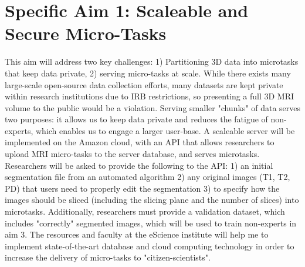 \section{Specific Aim 1: Scaleable and Secure Micro-Tasks}

This aim will address two key challenges: 1) Partitioning 3D data into microtasks that keep data private, 2) serving micro-tasks at scale. While there exists many large-scale open-source data collection efforts, many datasets are kept private within research institutions due to  IRB restrictions, so presenting a full 3D MRI volume to the public would be a violation. Serving smaller "chunks" of data serves two purposes: it allows us to keep data private and reduces the fatigue of non-experts, which enables us to engage a larger user-base. A scaleable server will be implemented on the Amazon cloud, with an API that allows researchers to upload MRI micro-tasks to the server database, and serves microtasks. Researchers will be asked to provide the following to the API: 1) an initial segmentation file from an automated algorithm 2) any original images (T1, T2, PD) that  users need to properly edit the segmentation 3) to specify how the images should be sliced (including the slicing plane and the number of slices) into microtasks. Additionally, researchers must provide a validation dataset, which includes "correctly" segmented images, which will be used to train non-experts in aim 3. The resources and faculty at the eScience institute will help me to implement state-of-the-art database and cloud computing technology in order to increase the delivery of micro-tasks to "citizen-scientists".